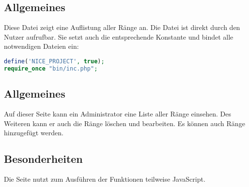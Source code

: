 \subsection{Allgemeines} Diese Datei zeigt eine Auflistung aller Ränge an.
Die Datei ist direkt durch den Nutzer aufrufbar. Sie setzt auch die entsprechende Konstante und bindet alle notwendigen Dateien ein:
\begin{lstlisting}[language=php]
define('NICE_PROJECT', true);
require_once "bin/inc.php";
\end{lstlisting}
\subsection{Allgemeines}
Auf dieser Seite kann ein Administrator eine Liste aller Ränge einsehen. Des Weiteren kann er auch die Ränge löschen und bearbeiten. Es können auch Ränge hinzugefügt werden.
\subsection{Besonderheiten}
Die Seite nutzt zum Ausführen der Funktionen teilweise JavaScript.

